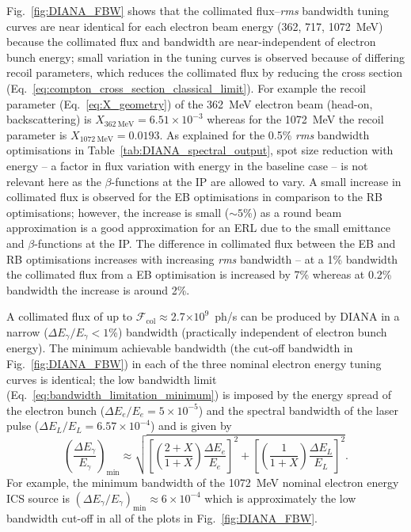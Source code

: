 \documentclass[../main.tex]{subfiles}
\begin{document}
Fig.~\ref{fig:DIANA_FBW} shows that the collimated flux--\textit{rms} bandwidth tuning curves are near identical for each electron beam energy (362, 717, 1072~\si{\mega\electronvolt}) because the collimated flux and bandwidth are near-independent of electron bunch energy; small variation in the tuning curves is observed because of differing recoil parameters, which reduces the collimated flux by reducing the cross section (Eq.~\ref{eq:compton_cross_section_classical_limit}). For example the recoil parameter (Eq.~\ref{eq:X_geometry}) of the 362~\si{\mega\electronvolt} electron beam (head-on, backscattering) is $X_{362~\si{\mega\electronvolt}}=6.51\times 10^{-3}$ whereas for the 1072~\si{\mega\electronvolt} the recoil parameter is $X_{1072~\si{\mega\electronvolt}}=0.0193$. As explained for the 0.5\% \textit{rms} bandwidth optimisations in Table~\ref{tab:DIANA_spectral_output}, spot size reduction with energy -- a factor in flux variation with energy in the baseline case -- is not relevant here as the $\beta$-functions at the IP are allowed to vary. A small increase in collimated flux is observed for the EB optimisations in comparison to the RB optimisations; however, the increase is small ($\sim5$\%) as a round beam approximation is a good approximation for an ERL due to the small emittance and $\beta$-functions at the IP. The difference in collimated flux between the EB and RB optimisations increases with increasing \textit{rms} bandwidth -- at a 1\% bandwidth the collimated flux from a EB optimisation is increased by 7\% whereas at 0.2\% bandwidth the increase is around 2\%.

A collimated flux of up to $\mathcal{F}_{\mathrm{col}}\approx$2.7$\times 10^{9}$~ph/\si{\second} can be produced by DIANA in a narrow ($\Delta E_{\gamma}/E_{\gamma}<1$\%) bandwidth (practically independent of electron bunch energy). The minimum achievable bandwidth (the cut-off bandwidth in Fig.~\ref{fig:DIANA_FBW}) in each of the three nominal electron energy tuning curves is identical; the low bandwidth limit (Eq.~\ref{eq:bandwidth_limitation_minimum}) is imposed by the energy spread of the electron bunch ($\Delta E_{e}/E_{e} = 5\times 10^{-5}$) and the spectral bandwidth of the laser pulse ($\Delta E_{L}/E_{L}=6.57\times 10^{-4}$) and is given by   
\begin{equation*}
\left(\frac{\Delta E_{\gamma}}{E_{\gamma}}\right)_{\mathrm{min}} \approx \sqrt{\left[\left(\frac{2+X}{1+X}\right)\frac{\Delta E_{e}}{E_{e}}\right]^{2} + \left[\left(\frac{1}{1+X}\right)\frac{\Delta E_{L}}{E_{L}}\right]^{2}}.
\end{equation*}
For example, the minimum bandwidth of the 1072~\si{\mega\electronvolt} nominal electron energy ICS source is $\left(\Delta E_{\gamma}/E_{\gamma}\right)_{\mathrm{min}} \approx 6\times 10^{-4}$ which is approximately the low bandwidth cut-off in all of the plots in Fig.~\ref{fig:DIANA_FBW}. 
   
\end{document}
